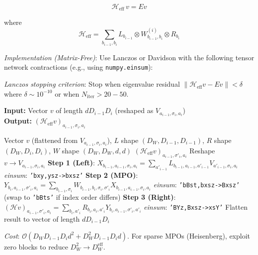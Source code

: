 \documentclass[aps,prb,onecolumn,scriptaddress]{revtex4-2}
\newcommand{\Order}{\mathcal{O}}
\begin{document}
	\begin{equation}
		\mathcal{H}_{\text{eff}} \, v = E v
	\end{equation}
	
	where 
	\begin{equation}
		\mathcal{H}_{\text{eff}} = \sum_{b_{i-1}, b_i} L_{b_{i-1}} \otimes W^{(i)}_{b_{i-1},b_i} \otimes R_{b_i}
	\end{equation}
	
	\textit{Implementation (Matrix-Free)}: Use Lanczos or Davidson with the following tensor network contractions (e.g., using \texttt{numpy.einsum}):
	
	\textit{Lanczos stopping criterion}: Stop when eigenvalue residual $\|\mathcal{H}_{\text{eff}}v - Ev\| < \delta$ where $\delta \sim 10^{-10}$ or when $N_{\text{iter}} > 20-50$.
		
	\textbf{Input:} Vector $v$ of length $d D_{i-1} D_i$ (reshaped as $V_{a_{i-1},\sigma_i,a_i}$)\\
	
	\textbf{Output:} $(\mathcal{H}_{\text{eff}}v)_{a_{i-1},\sigma_i,a_i}$
	
	\begin{algorithm}[H]
		\caption{ApplyEffectiveHamiltonian (Matrix-Free)}
		\begin{algorithmic}[1]
			\Require Vector $v$ (flattened from $V_{a_{i-1},\sigma_i,a_i}$), $L$ shape $(D_W, D_{i-1}, D_{i-1})$, $R$ shape $(D_W, D_i, D_i)$, $W$ shape $(D_W, D_W, d, d)$
			\Ensure $(\mathcal{H}_{\text{eff}}v)_{a_{i-1},\sigma'_i,a_i}$
			\State Reshape $v \to V_{a_{i-1},\sigma_i,a_i}$ 
			\State \textbf{Step 1 (Left)}: $X_{b_{i-1},a_{i-1},\sigma_i,a_i} = \sum_{a'_{i-1}} L_{b_{i-1},a_{i-1},a'_{i-1}} V_{a'_{i-1},\sigma_i,a_i}$
			\State {} \textit{einsum}: \texttt{'bxy,ysz->bxsz'}
			\State \textbf{Step 2 (MPO)}: $Y_{b_i,a_{i-1},\sigma'_i,a_i} = \sum_{b_{i-1},\sigma_i} W_{b_{i-1},b_i,\sigma_i,\sigma'_i} X_{b_{i-1},a_{i-1},\sigma_i,a_i}$  
			\State {} \textit{einsum}: \texttt{'bBst,bxsz->Bxsz'} (swap to \texttt{'bBts'} if index order differs)
			\State \textbf{Step 3 (Right)}: $(\mathcal{H}v)_{a_{i-1},\sigma'_i,a_i} = \sum_{b_i, a'_i} R_{b_i,a_i,a'_i} Y_{b_i,a_{i-1},\sigma'_i,a'_i}$
			\State {} \textit{einsum}: \texttt{'BYz,Bxsz->xsY'} 
			\State \Return Flatten result to vector of length $d D_{i-1} D_i$
		\end{algorithmic}
	\end{algorithm}
	\textit{Cost}: $\Order(D_W D_{i-1} D_i d^2 + D_W^2 D_{i-1} D_i d)$. For sparse MPOs (Heisenberg), exploit zero blocks to reduce $D_W^2 \to D_W^{\text{eff}}$.
	
\end{document}
